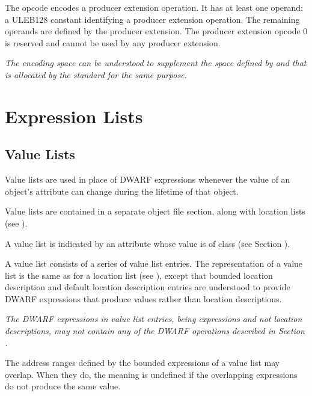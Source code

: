 \begin{enumerate}[1. ]
\bb
\itembfnl{\DWOPuserextendedTARG}
The \DWOPuserextendedNAME{} opcode encodes a
\bb
producer
\eb
extension operation.
It has at least one operand: a ULEB128 constant identifying a
\bb
producer
\eb
extension operation. The remaining operands are defined by the
\bb
producer
\eb
extension. The
\bb
producer
\eb
extension opcode 0 is reserved and cannot be used by any
\bb
producer
\eb
extension.

\textit{The \DWOPuserextended{} encoding space can be understood to supplement
the space defined by \DWOPlouser{} and \DWOPhiuser{} that is allocated by
the standard for the same purpose.}
\eb

\end{enumerate}

\section{Expression Lists}
\label{chap:expressionlists}
\bb

\subsection{Value Lists}
\label{chap:valuelists}
Value lists are used in place of 
DWARF expressions whenever the value of an object's attribute 
can change during the lifetime of that object.

Value lists are contained in a separate object file section,
along with location lists (see ).

A value list is indicated by an attribute whose value is of class
\label{chap:classvallist}\CLASSvallist{} (see Section ).

A value list consists of a series of value list entries. 
The representation of a value list is the same as for a 
location list (see ), except 
that bounded location description and default location description 
entries are understood to provide DWARF expressions that produce 
values rather than location descriptions.

\textit{The DWARF expressions in value list entries, being
expressions and not location descriptions, may not contain
any of the DWARF operations described in Section
.}

The address ranges defined by the bounded expressions of a
value list may overlap. When they do, the meaning is undefined
if the overlapping expressions do not produce the same value.
\eb

